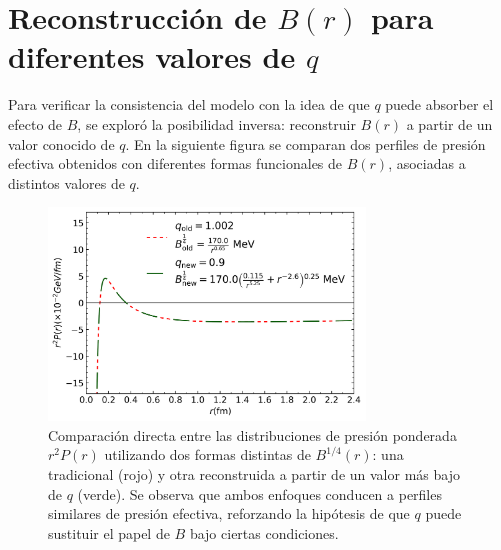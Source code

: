 \section{Reconstrucci\'on de \( B(r) \) para diferentes valores de \( q \)}

Para verificar la consistencia del modelo con la idea de que \( q \) puede absorber el efecto de \( B \), se explor\'o la posibilidad inversa: reconstruir \( B(r) \) a partir de un valor conocido de \( q \). En la siguiente figura se comparan dos perfiles de presi\'on efectiva obtenidos con diferentes formas funcionales de \( B(r) \), asociadas a distintos valores de \( q \).


\begin{figure}[H]
    \centering
    \includegraphics[width=0.75\textwidth]{./Images/Comparacion_B_old_new_combined.png}
    \caption[Comparaci\'on entre presiones con \( q = 1.002 \) y \( q = 0.9 \)]{Comparaci\'on directa entre las distribuciones de presi\'on ponderada \( r^2 P(r) \) utilizando dos formas distintas de \( B^{1/4}(r) \): una tradicional (rojo) y otra reconstruida a partir de un valor m\'as bajo de \( q \) (verde). Se observa que ambos enfoques conducen a perfiles similares de presi\'on efectiva, reforzando la hip\'otesis de que \( q \) puede sustituir el papel de \( B \) bajo ciertas condiciones.}
    \label{fig:B_reconstructed_combined}
\end{figure}


